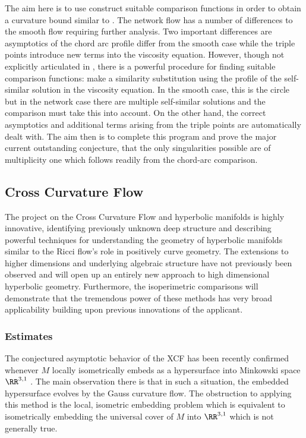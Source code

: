 \documentclass[12pt]{amsart}
\begin{document}
The aim here is to use construct suitable comparison functions in order to obtain a curvature bound similar to \cite{MR2794630}. The network flow has a number of differences to the smooth flow requiring further analysis. Two important differences are asymptotics of the chord arc profile differ from the smooth case while the triple points introduce new terms into the viscosity equation. However, though not explicitly articulated in \cite{MR2794630}, there is a powerful procedure for finding suitable comparison functions: make a similarity substitution using the profile of the self-similar solution in the viscosity equation. In the smooth case, this is the circle but in the network case there are multiple self-similar solutions and the comparison must take this into account. On the other hand, the correct asymptotics and additional terms arising from the triple points are automatically dealt with. The aim then is to complete this program and prove the major current outstanding conjecture, that the only singularities possible are of multiplicity one which follows readily from the chord-arc comparison.

\subsection*{Cross Curvature Flow}
\label{sec-3-4}

The project on the Cross Curvature Flow and hyperbolic manifolds is highly innovative, identifying previously unknown deep structure and describing powerful techniques for understanding the geometry of hyperbolic manifolds similar to the Ricci flow's role in positively curve geometry. The extensions to higher dimensions and underlying algebraic structure have not previously been observed and will open up an entirely new approach to high dimensional hyperbolic geometry. Furthermore, the isoperimetric comparisons will demonstrate that the tremendous power of these methods has very broad applicability building upon previous innovations of the applicant.

\subsubsection*{Estimates}
\label{sec-3-4-1}


The conjectured asymptotic behavior of the XCF has been recently confirmed whenever $M$ locally isometrically embeds as a hypersurface into Minkowski space $\RR^{3,1}$ \cite{MR3344442}. The main observation there is that in such a situation, the embedded hypersurface evolves by the Gauss curvature flow. The obstruction to applying this method is the local, isometric embedding problem which is equivalent to isometrically embedding the universal cover of $M$ into $\RR^{3,1}$ which is not generally true.
\end{document}
